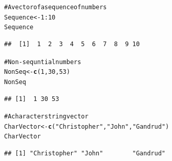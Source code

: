 \documentclass{beamer}\usepackage{graphicx, color}
\makeatletter
\newcommand{\hlfunctioncall}[1]{\textcolor[rgb]{0.501960784313725,0,0.329411764705882}{\textbf{#1}}}%
\newcommand{\hlstring}[1]{\textcolor[rgb]{0.6,0.6,1}{#1}}%
\newcommand{\hlcomment}[1]{\textcolor[rgb]{0.180392156862745,0.6,0.341176470588235}{#1}}%
\newenvironment{kframe}{%
 \def\at@end@of@kframe{}%
 \ifinner\ifhmode%
  \def\at@end@of@kframe{\end{minipage}}%
  \begin{minipage}{\columnwidth}%
 \fi\fi%
 \def\FrameCommand##1{\hskip\@totalleftmargin \hskip-\fboxsep
 \colorbox{shadecolor}{##1}\hskip-\fboxsep
     \hskip-\linewidth \hskip-\@totalleftmargin \hskip\columnwidth}%
 \MakeFramed {\advance\hsize-\width
   \@totalleftmargin\z@ \linewidth\hsize
   \@setminipage}}%
 {\par\unskip\endMakeFramed%
 \at@end@of@kframe}
\newenvironment{knitrout}{}{} %
\makeatother
\begin{document}
\begin{frame}

\begin{knitrout}
\color{fgcolor}\begin{kframe}
\begin{alltt}
\hlcomment{# A vector of a sequence of numbers}
Sequence <- 1:10
Sequence
\end{alltt}
\begin{verbatim}
##  [1]  1  2  3  4  5  6  7  8  9 10
\end{verbatim}
\begin{alltt}

\hlcomment{# Non-sequntial numbers}
NonSeq <- \hlfunctioncall{c}(1, 30, 53)
NonSeq
\end{alltt}
\begin{verbatim}
## [1]  1 30 53
\end{verbatim}
\begin{alltt}

\hlcomment{# A character string vector}
CharVector <- \hlfunctioncall{c}(\hlstring{"Christopher"}, \hlstring{"John"}, \hlstring{"Gandrud"})
CharVector
\end{alltt}
\begin{verbatim}
## [1] "Christopher" "John"        "Gandrud"
\end{verbatim}
\end{kframe}
\end{knitrout}

\end{frame}


\end{document}
